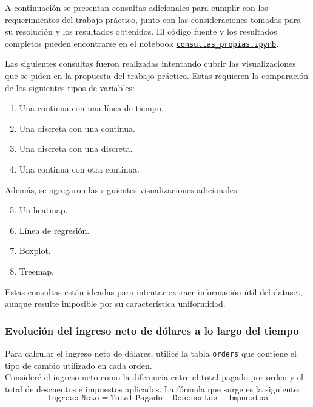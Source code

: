 A continuación se presentan consultas adicionales para cumplir con los requerimientos del trabajo práctico, junto con las consideraciones tomadas para su resolución y los resultados obtenidos. El código fuente y los resultados completos pueden encontrarse en el notebook \href{https://github.com/patricioibar/datos-tp1/blob/main/consultas_propias.ipynb}{\texttt{consultas\_propias.ipynb}}.

Las siguientes consultas fueron realizadas intentando cubrir las visualizaciones que se piden en la propuesta del trabajo práctico. Estas requieren la comparación de los siguientes tipos de variables:
\begin{enumerate}
    \item Una continua con una línea de tiempo.
    \item Una discreta con una continua.
    \item Una discreta con una discreta.
    \item Una continua con otra continua.
\vspace{-1em}
\end{enumerate}
Además, se agregaron las siguientes visualizaciones adicionales:
\vspace{-1em}
\begin{enumerate}
    \setcounter{enumi}{4}
    \item Un heatmap.
    \item Línea de regresión.
    \item Boxplot.
    \item Treemap.
\end{enumerate}

Estas consultas están ideadas para intentar extraer información útil del dataset, aunque resulte imposible por su característica uniformidad.

\subsubsection{Evolución del ingreso neto de dólares a lo largo del tiempo}

Para calcular el ingreso neto de dólares, utilicé la tabla \texttt{orders} que contiene el tipo de cambio utilizado en cada orden.\\
Consideré el ingreso neto como la diferencia entre el total pagado por orden y el total de descuentos e impuestos aplicados. La fórmula que surge es la siguiente:
\[\texttt{Ingreso Neto} = \texttt{Total Pagado} - \texttt{Descuentos} - \texttt{Impuestos}\]

